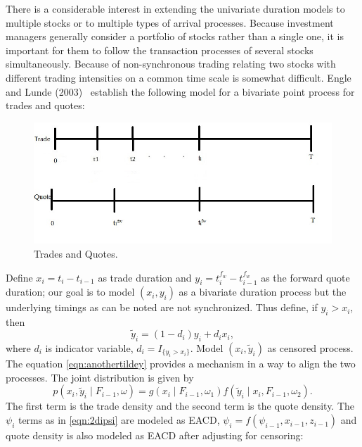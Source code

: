 There is a considerable interest in extending the univariate duration models to multiple stocks or to multiple types of arrival processes. Because investment managers generally consider a portfolio of stocks rather than a single one, it is important for them to follow the transaction processes of several stocks simultaneously. Because of non-synchronous trading relating two stocks with different trading intensities on a common time scale is somewhat difficult. Engle and Lunde (2003)~\cite{englelunde} establish the following model for a bivariate point process for trades and quotes:
	\begin{figure}[!ht]
	\centering
	\includegraphics[width=\textwidth]{chapters/chapter_advanced/figures/33d3.jpg}
	\caption{Trades and Quotes. \label{fig:tradeactdoubline}}
	\end{figure}
Define $x_i = t_i - t_{i-1}$ as trade duration and $y_i = t_i^{f_w} - t_{i-1}^{f_w}$ as the forward quote duration; our goal is to model $(x_i,y_i)$ as a bivariate duration process but the underlying timings as can be noted are not synchronized. Thus define, if $y_i > x_i$, then
	\begin{equation} \label{eqn:anothertildey}
	\widetilde{y}_i = (1 - d_i)y_i + d_ix_i,
	\end{equation}
where $d_i$ is indicator variable, $d_i = I_{\{y_i>x_i\}}$. Model $(x_i,\widetilde{y}_i)$ as censored process. The equation \eqref{eqn:anothertildey} provides a mechanism in a way to align the two processes. The joint distribution is given by
	\begin{equation} \label{eqn:2pxiyi}
	p(x_i,\widetilde{y}_i \;|\; F_{i-1}, \omega) = g(x_i \;|\; F_{i-1}, \omega_1) f(\widetilde{y}_i \;|\; x_i, F_{i-1}, \omega_2).
	\end{equation}
The first term is the trade density and the second term is the quote density. The $\psi_i$ terms as in \eqref{eqn:2dipsi} are modeled as EACD, $\psi_i= f(\psi_{i-1}, x_{i-1}, z_{i-1})$ and quote density is also modeled as EACD after adjusting for censoring:

